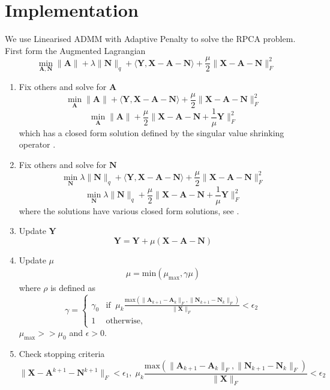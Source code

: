 \documentclass{article}
\begin{document}
\section{Implementation}

We use Linearised ADMM with Adaptive Penalty \cite{lin2011linearized} to solve the RPCA problem. First form the Augmented Lagrangian
\[
\min_{\mathbf{A, N}} \|\mathbf A \| + \lambda\|\mathbf N\|_{q} + \langle \mathbf{Y, X - A - N} \rangle + \frac{\mu}{2} \| \mathbf{X - A - N}  \|_F^2
\]

\begin{enumerate}
\item Fix others and solve for $\mathbf A$
\[
\min_{\mathbf{A}} \|\mathbf A \| + \langle \mathbf{Y, X - A - N} \rangle + \frac{\mu}{2} \| \mathbf{X - A - N}  \|_F^2
\]
\[
\min_{\mathbf{A}} \|\mathbf A \| + \frac{\mu}{2} \| \mathbf{X - A - N} + \frac{1}{\mu}\mathbf Y  \|_F^2
\]
which has a closed form solution defined by the singular value shrinking operator \cite{lin2011linearized,candes2011robust}.

\item Fix others and solve for $\mathbf N$
\[
\min_{\mathbf{N}} \lambda\|\mathbf N\|_{q} + \langle \mathbf{Y, X - A - N} \rangle + \frac{\mu}{2} \| \mathbf{X - A - N}  \|_F^2
\]
\[
\min_{\mathbf{N}} \lambda\|\mathbf N\|_{q} + \frac{\mu}{2} \| \mathbf{X - A - N} + \frac{1}{\mu}\mathbf Y \|_F^2
\]
where the solutions have various closed form solutions, see \cite{candes2011robust, liu2010robust}.

\item Update $\mathbf Y$
\[
\mathbf Y = \mathbf Y + \mu( \mathbf{X - A - N} )
\]

\item Update $\mu$
\begin{align*}
 \mu = \textrm{min}( \mu_{\text{max}}, \gamma \mu)
\end{align*}
where $\rho$ is defined as
\[
\gamma = 
\begin{cases}
\gamma_0 & \text{if} \;\; \mu_k \frac{\textrm{max} ( \| \mathbf A_{k+1} - \mathbf A_{k}  \|_F  , \|  \mathbf N_{k+1} - \mathbf N_{k} \|_F)}{\| \mathbf X \|_F} < \epsilon_2 \\
1 & \text{otherwise,}
\end{cases}
\]
$\mu_{\text{max}} >>  \mu_0$ and $\epsilon > 0$.

\item Check stopping criteria
\[
\|\mathbf X - \mathbf A^{k+1}  - \mathbf N^{k+1} \|_F < \epsilon_1, \;
 \mu_k \frac{\textrm{max} ( \| \mathbf A_{k+1} - \mathbf A_{k}  \|_F  , \|  \mathbf N_{k+1} - \mathbf N_{k} \|_F)}{\| \mathbf X \|_F} < \epsilon_2
\]


\end{enumerate}



\end{document}
